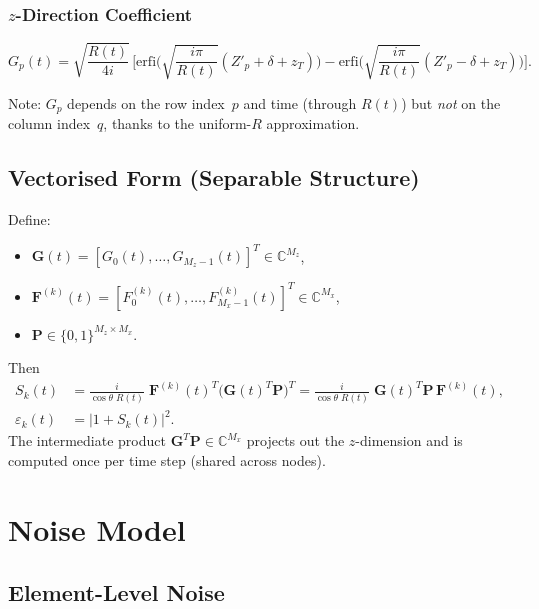 \documentclass[11pt,a4paper]{article}
\newcommand{\C}{\mathbb{C}}
\newcommand{\erfi}{\mathrm{erfi}}
\begin{document}
\subsubsection{$z$-Direction Coefficient}
\begin{equation}
  G_p(t)
  = \sqrt{\frac{R(t)}{4i}}\,\biggl[
    \erfi\!\biggl(\sqrt{\frac{i\pi}{R(t)}}
    (Z'_p{+}\delta{+}z_T)\biggr)
  - \erfi\!\biggl(\sqrt{\frac{i\pi}{R(t)}}
    (Z'_p{-}\delta{+}z_T)\biggr)\biggr].
  \label{eq:Gp}
\end{equation}

Note: $G_p$ depends on the row index~$p$ and time (through $R(t)$)
but \emph{not} on the column index~$q$, thanks to the uniform-$R$
approximation.

\subsection{Vectorised Form (Separable Structure)}

Define:
\begin{itemize}
  \item $\mathbf{G}(t)=[G_0(t),\ldots,G_{M_z-1}(t)]^T
    \in\C^{M_z}$,
  \item $\mathbf{F}^{(k)}(t)=[F_0^{(k)}(t),\ldots,
    F_{M_x-1}^{(k)}(t)]^T\in\C^{M_x}$,
  \item $\mathbf{P}\in\{0,1\}^{M_z\times M_x}$.
\end{itemize}
Then
\begin{align}
  S_k(t) &= \frac{i}{\cos\theta\;R(t)}\;
  \mathbf{F}^{(k)}(t)^T\bigl(\mathbf{G}(t)^T\mathbf{P}\bigr)^T
  = \frac{i}{\cos\theta\;R(t)}\;
  \mathbf{G}(t)^T\mathbf{P}\,\mathbf{F}^{(k)}(t),
  \label{eq:Sk}\\
  \varepsilon_k(t) &= |1+S_k(t)|^2.
  \label{eq:eps}
\end{align}
The intermediate product $\mathbf{G}^T\mathbf{P}\in\C^{M_x}$
projects out the $z$-dimension and is computed once per time step
(shared across nodes).

\section{Noise Model}
\label{sec:noise}

\subsection{Element-Level Noise}
\end{document}
